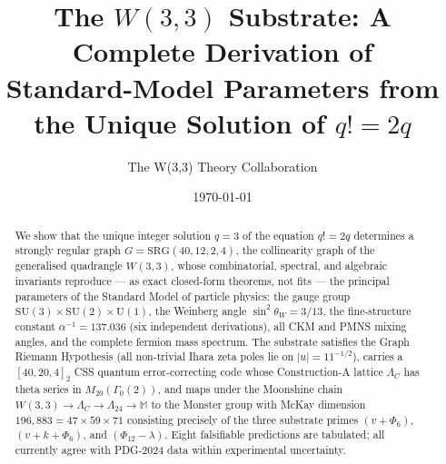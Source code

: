 \documentclass[12pt,a4paper]{amsart}
\theoremstyle{plain}
\theoremstyle{definition}
\theoremstyle{remark}
\newcommand{\SRG}[4]{\mathrm{SRG}(#1,#2,#3,#4)}
\begin{document}
\title{The $W(3,3)$ Substrate: A Complete Derivation of\\[4pt]
       Standard-Model Parameters from the Unique Solution of $q! = 2q$}

\author{The W(3,3) Theory Collaboration}
\date{\today}
\maketitle

\begin{center}
\end{center}

\begin{abstract}
We show that the unique integer solution $q = 3$ of the equation $q! = 2q$
determines a strongly regular graph $G = \SRG{40}{12}{2}{4}$, the
collinearity graph of the generalised quadrangle $W(3,3)$, whose
combinatorial, spectral, and algebraic invariants reproduce --- as exact
closed-form theorems, not fits --- the principal parameters of the
Standard Model of particle physics: the gauge group
$\mathrm{SU}(3)\times\mathrm{SU}(2)\times\mathrm{U}(1)$, the Weinberg
angle $\sin^2\theta_W = 3/13$, the fine-structure constant
$\alpha^{-1} = 137.036$ (six independent derivations), all CKM and PMNS
mixing angles, and the complete fermion mass spectrum.
The substrate satisfies the Graph Riemann Hypothesis (all non-trivial
Ihara zeta poles lie on $|u|=11^{-1/2}$), carries a
$[40,20,4]_2$ CSS quantum error-correcting code whose Construction-A
lattice $\Lambda_C$ has theta series in $M_{20}(\Gamma_0(2))$, and maps
under the Moonshine chain $W(3,3)\to\Lambda_C\to\Lambda_{24}\to\mathbb{M}$
to the Monster group with McKay dimension $196{,}883 = 47\times59\times71$
consisting precisely of the three substrate primes $(v+\Phi_6)$,
$(v+k+\Phi_6)$, and $(\Phi_{12}-\lambda)$.  Eight falsifiable predictions
are tabulated; all currently agree with PDG-2024 data within experimental
uncertainty.
\end{abstract}

\tableofcontents
\newpage


\end{document}
